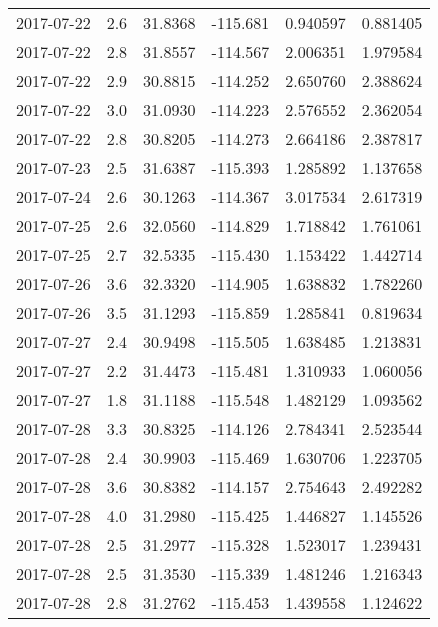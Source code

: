\begin{tabular}{lrrrrr}
2017-07-22 &       2.6 &  31.8368 &  -115.681 &         0.940597 &         0.881405 \\
2017-07-22 &       2.8 &  31.8557 &  -114.567 &         2.006351 &         1.979584 \\
2017-07-22 &       2.9 &  30.8815 &  -114.252 &         2.650760 &         2.388624 \\
2017-07-22 &       3.0 &  31.0930 &  -114.223 &         2.576552 &         2.362054 \\
2017-07-22 &       2.8 &  30.8205 &  -114.273 &         2.664186 &         2.387817 \\
2017-07-23 &       2.5 &  31.6387 &  -115.393 &         1.285892 &         1.137658 \\
2017-07-24 &       2.6 &  30.1263 &  -114.367 &         3.017534 &         2.617319 \\
2017-07-25 &       2.6 &  32.0560 &  -114.829 &         1.718842 &         1.761061 \\
2017-07-25 &       2.7 &  32.5335 &  -115.430 &         1.153422 &         1.442714 \\
2017-07-26 &       3.6 &  32.3320 &  -114.905 &         1.638832 &         1.782260 \\
2017-07-26 &       3.5 &  31.1293 &  -115.859 &         1.285841 &         0.819634 \\
2017-07-27 &       2.4 &  30.9498 &  -115.505 &         1.638485 &         1.213831 \\
2017-07-27 &       2.2 &  31.4473 &  -115.481 &         1.310933 &         1.060056 \\
2017-07-27 &       1.8 &  31.1188 &  -115.548 &         1.482129 &         1.093562 \\
2017-07-28 &       3.3 &  30.8325 &  -114.126 &         2.784341 &         2.523544 \\
2017-07-28 &       2.4 &  30.9903 &  -115.469 &         1.630706 &         1.223705 \\
2017-07-28 &       3.6 &  30.8382 &  -114.157 &         2.754643 &         2.492282 \\
2017-07-28 &       4.0 &  31.2980 &  -115.425 &         1.446827 &         1.145526 \\
2017-07-28 &       2.5 &  31.2977 &  -115.328 &         1.523017 &         1.239431 \\
2017-07-28 &       2.5 &  31.3530 &  -115.339 &         1.481246 &         1.216343 \\
2017-07-28 &       2.8 &  31.2762 &  -115.453 &         1.439558 &         1.124622 \\

\end{tabular}
